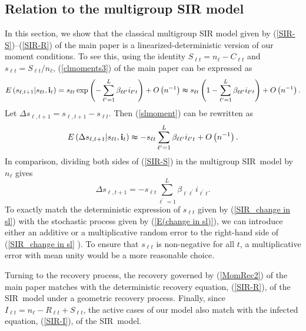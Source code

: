 \documentclass[12pt]{article}
\begin{document}
\subsection{Relation to the multigroup SIR model \label{Sec: Relation to SIR}}

In this section, we show that the classical multigroup SIR model given by
(\ref{SIR-S})--(\ref{SIR-R}) of the main paper is a linearized-deterministic
version of our moment conditions. To see this, using the identity $S_{\ell
t}=n_{\ell}-C_{\ell t}$ and $s_{\ell t}=S_{\ell t}/n_{\ell}$,
(\ref{clmoments3}) of the main paper can be expressed as%
\begin{equation}
E\left(  s_{\ell,t+1}|s_{\ell t},\mathbf{i}_{t}\right)  =s_{\ell t}\exp\left(
-\sum_{\ell^{\prime}=1}^{L}\beta_{\ell\ell^{\prime}}i_{\ell^{\prime}t}\right)
+O\left(  n^{-1}\right)  \thickapprox s_{\ell t}\left(  1-\sum_{\ell^{\prime
}=1}^{L}\beta_{\ell\ell^{\prime}}i_{\ell^{\prime}t}\right)  +O\left(
n^{-1}\right)  . \label{slmoment}%
\end{equation}
Let $\Delta s_{\ell,t+1}=s_{\ell,t+1}-s_{\ell t}$. Then (\ref{slmoment}) can
be rewritten as%
\begin{equation}
E\left(  \Delta s_{\ell,t+1}|s_{\ell t},\mathbf{i}_{t}\right)  \thickapprox
-s_{\ell t}\sum_{\ell^{\prime}=1}^{L}\beta_{\ell\ell^{\prime}}i_{\ell^{\prime
}t}+O\left(  n^{-1}\right)  . \label{E(change in sl)}%
\end{equation}
In comparison, dividing both sides of (\ref{SIR-S}) in the multigroup
SIR\ model by $n_{\ell}$ gives%
\begin{equation}
\Delta s_{\ell,t+1}=-s_{\ell t}\sum_{\ell^{\prime}=1}^{L}\beta_{\ell
\ell^{\prime}}i_{\ell^{\prime}t}. \label{SIR_change in sl}%
\end{equation}
To exactly match the deterministic expression of $s_{\ell t}$ given by
(\ref{SIR_change in sl}) with the stochastic process given by
(\ref{E(change in sl)}), we can introduce either an additive or a
multiplicative random error to the right-hand side of (\ref{SIR_change in sl}%
). To ensure that $s_{\ell t}$ is non-negative for all $t$, a multiplicative
error with mean unity would be a more reasonable choice.

Turning to the recovery process, the recovery governed by (\ref{MomRec2}) of
the main paper matches with the deterministic recovery equation,
(\ref{SIR-R}), of the SIR\ model under a geometric recovery process. Finally,
since $I_{\ell t}=n_{\ell}-R_{\ell t}+S_{\ell t}$, the active cases of our
model also match with the infected equation, (\ref{SIR-I}), of the SIR\ model.
\end{document}
